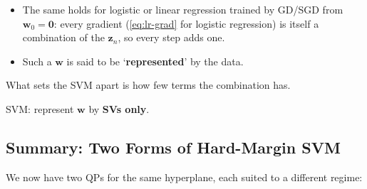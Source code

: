 \begin{itemize}
    \item The same holds for logistic or linear regression trained by GD/SGD
        from \(\bm{w}_0 = \bm{0}\): every gradient (\autoref{eq:lr-grad} for
        logistic regression) is itself a combination of the \(\bm{z}_n\), so
        every step adds one.
    \item Such a \(\bm{w}\) is said to be `\textbf{represented}' by the data.
\end{itemize}
What sets the SVM apart is how few terms the combination has.

\begin{moral}
    SVM: represent \(\bm{w}\) by \textbf{SVs only}.
\end{moral}

\subsection{Summary: Two Forms of Hard-Margin SVM}

We now have two QPs for the same hyperplane, each suited to a different
regime:

